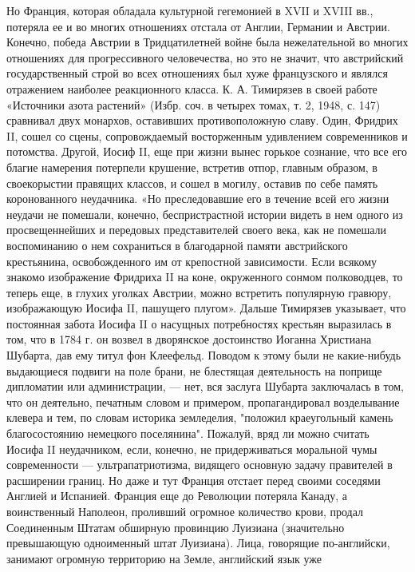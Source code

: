 Но Франция, которая обладала культурной гегемонией в XVII и XVIII вв., потеряла
ее и во многих отношениях отстала от Англии, Германии и Австрии. Конечно,
победа Австрии в Тридцатилетней войне была нежелательной во многих отношениях
для прогрессивного человечества, но это не значит, что австрийский
государственный строй во
всех отношениях был хуже французского и являлся отражением наиболее
реакционного класса. К. А. Тимирязев в своей работе «Источники азота растений»
(Избр. соч. в четырех томах, т. 2, 1948, с. 147) сравнивал двух монархов,
оставивших противоположную славу. Один, Фридрих II, сошел со сцены,
сопровождаемый восторженным удивлением современников и потомства. Другой, Иосиф
II, еще при жизни вынес горькое сознание, что все его благие намерения
потерпели крушение, встретив отпор, главным образом, в своекорыстии правящих
классов, и сошел в могилу, оставив по себе память коронованного неудачника. «Но
преследовавшие его в течение всей его жизни неудачи не помешали, конечно,
беспристрастной истории видеть в нем одного из просвещеннейших и передовых
представителей своего века, как не помешали воспоминанию о нем сохраниться в
благодарной памяти австрийского крестьянина, освобожденного им от крепостной
зависимости. Если всякому знакомо изображение Фридриха II на коне, окруженного
сонмом полководцев, то теперь еще, в глухих уголках Австрии, можно встретить
популярную гравюру, изображающую Иосифа II, пашущего плугом». Дальше Тимирязев
указывает, что постоянная забота Иосифа II о насущных потребностях крестьян
выразилась в том, что в 1784 г. он возвел в дворянское достоинство Иоганна
Христиана Шубарта, дав ему титул фон Клеефельд. Поводом к этому были не
какие-нибудь выдающиеся подвиги на поле брани, не блестящая деятельность на
поприще дипломатии или администрации, --- нет, вся заслуга Шубарта заключалась в
том, что он деятельно, печатным словом и примером, пропагандировал возделывание
клевера и тем, по словам историка земледелия, "положил краеугольный камень
благосостоянию немецкого поселянина". Пожалуй, вряд ли можно считать Иосифа II
неудачником, если, конечно, не придерживаться моральной чумы современности ---
ультрапатриотизма, видящего основную задачу правителей в расширении границ. Но
даже и тут Франция отстает перед своими соседями Англией и Испанией. Франция
еще до Революции потеряла Канаду, а воинственный Наполеон, проливший огромное
количество крови, продал Соединенным Штатам обширную провинцию Луизиана
(значительно превышающую одноименный штат Луизиана). Лица, говорящие
по-английски, занимают огромную территорию на Земле, английский язык уже
